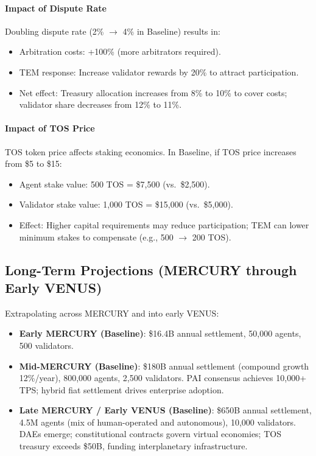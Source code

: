\documentclass[11pt]{article}
\begin{document}
\paragraph{Impact of Dispute Rate}
Doubling dispute rate (2\% $\to$ 4\% in Baseline) results in:
\begin{itemize}[noitemsep]
  \item Arbitration costs: +100\% (more arbitrators required).
  \item TEM response: Increase validator rewards by 20\% to attract participation.
  \item Net effect: Treasury allocation increases from 8\% to 10\% to cover costs; validator share decreases from 12\% to 11\%.
\end{itemize}

\paragraph{Impact of TOS Price}
TOS token price affects staking economics. In Baseline, if TOS price increases from \$5 to \$15:
\begin{itemize}[noitemsep]
  \item Agent stake value: 500 TOS = \$7{,}500 (vs.\ \$2{,}500).
  \item Validator stake value: 1,000 TOS = \$15{,}000 (vs.\ \$5{,}000).
  \item Effect: Higher capital requirements may reduce participation; TEM can lower minimum stakes to compensate (e.g., 500 $\to$ 200 TOS).
\end{itemize}

\subsection{Long-Term Projections (MERCURY through Early VENUS)}
Extrapolating across MERCURY and into early VENUS:
\begin{itemize}[noitemsep]
  \item \textbf{Early MERCURY (Baseline)}: \$16.4B annual settlement, 50,000 agents, 500 validators.
  \item \textbf{Mid-MERCURY (Baseline)}: \$180B annual settlement (compound growth 12\%/year), 800,000 agents, 2,500 validators. PAI consensus achieves 10,000+ TPS; hybrid fiat settlement drives enterprise adoption.
  \item \textbf{Late MERCURY / Early VENUS (Baseline)}: \$650B annual settlement, 4.5M agents (mix of human-operated and autonomous), 10,000 validators. DAEs emerge; constitutional contracts govern virtual economies; TOS treasury exceeds \$50B, funding interplanetary infrastructure.
\end{itemize}
\end{document}
